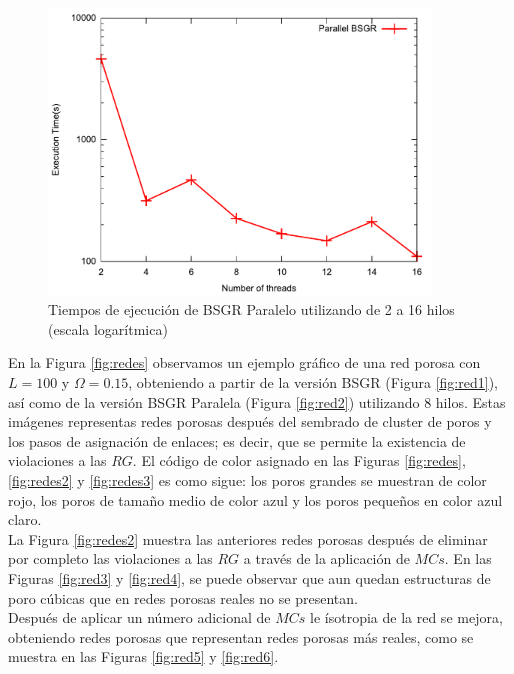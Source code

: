 \begin{figure}[hbtp]
\centering
\includegraphics[width=4in]{img/tiempoPar2To16.pdf}
\caption{Tiempos de ejecución de BSGR Paralelo utilizando de 2 a 16 hilos (escala logarítmica)}
\label{fig:timenuevo}
\end{figure}

En la Figura \ref{fig:redes} observamos un ejemplo gráfico de una red porosa con $L=100$ y $\Omega=0.15$, obteniendo a partir de la versión BSGR (Figura \ref{fig:red1}), así como de la versión BSGR Paralela (Figura \ref{fig:red2}) utilizando 8 hilos. Estas imágenes representas redes porosas después del sembrado de cluster de poros y los pasos de asignación de enlaces; es decir, que se permite la existencia de violaciones a las $RG$. El código de color asignado en las Figuras \ref{fig:redes}, \ref{fig:redes2} y \ref{fig:redes3} es como sigue: los poros grandes se muestran de color rojo, los poros de tamaño medio de color azul y los poros pequeños en color azul claro.\\

La Figura \ref{fig:redes2} muestra las anteriores redes porosas después de eliminar por completo las violaciones a las $RG$ a través de la aplicación de $MCs$. En las Figuras \ref{fig:red3} y \ref{fig:red4}, se puede observar que aun quedan estructuras de poro cúbicas que en redes porosas reales no se presentan.\\

Después de aplicar un número adicional de $MCs$ le ísotropia de la red se mejora, obteniendo redes porosas que representan redes porosas más reales, como se muestra en las Figuras \ref{fig:red5} y \ref{fig:red6}.\\

